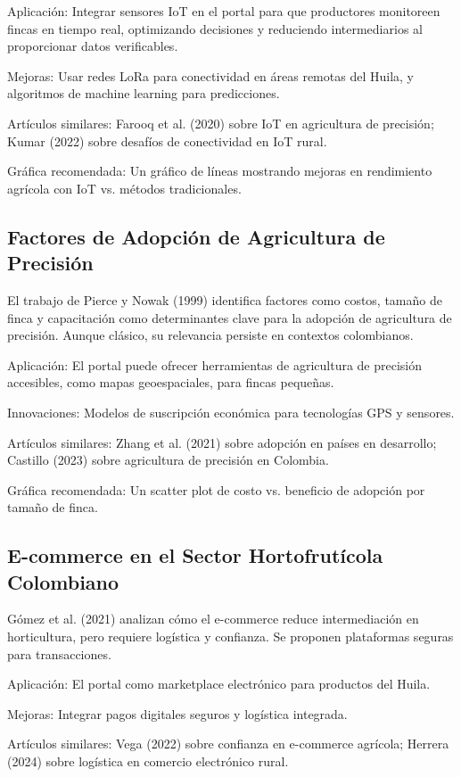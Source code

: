 Aplicación: Integrar sensores IoT en el portal para que productores monitoreen fincas en tiempo real, optimizando decisiones y reduciendo intermediarios al proporcionar datos verificables.

Mejoras: Usar redes LoRa para conectividad en áreas remotas del Huila, y algoritmos de machine learning para predicciones.

Artículos similares: Farooq et al. (2020) sobre IoT en agricultura de precisión; Kumar (2022) sobre desafíos de conectividad en IoT rural.

Gráfica recomendada: Un gráfico de líneas mostrando mejoras en rendimiento agrícola con IoT vs. métodos tradicionales.

\subsection{Factores de Adopción de Agricultura de Precisión}

El trabajo de Pierce y Nowak (1999) identifica factores como costos, tamaño de finca y capacitación como determinantes clave para la adopción de agricultura de precisión. Aunque clásico, su relevancia persiste en contextos colombianos.

Aplicación: El portal puede ofrecer herramientas de agricultura de precisión accesibles, como mapas geoespaciales, para fincas pequeñas.

Innovaciones: Modelos de suscripción económica para tecnologías GPS y sensores.

Artículos similares: Zhang et al. (2021) sobre adopción en países en desarrollo; Castillo (2023) sobre agricultura de precisión en Colombia.

Gráfica recomendada: Un scatter plot de costo vs. beneficio de adopción por tamaño de finca.

\subsection{E-commerce en el Sector Hortofrutícola Colombiano}

Gómez et al. (2021) analizan cómo el e-commerce reduce intermediación en horticultura, pero requiere logística y confianza. Se proponen plataformas seguras para transacciones.

Aplicación: El portal como marketplace electrónico para productos del Huila.

Mejoras: Integrar pagos digitales seguros y logística integrada.

Artículos similares: Vega (2022) sobre confianza en e-commerce agrícola; Herrera (2024) sobre logística en comercio electrónico rural.

